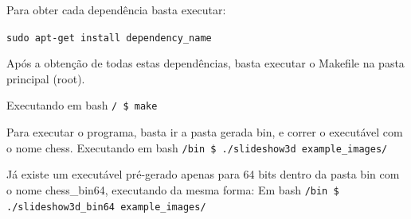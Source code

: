 \documentclass[portugues,final]{revdetua}
\begin{document}
Para obter cada dependência basta executar:

{\tt sudo apt-get install dependency\_name}

Após a obtenção de todas estas dependências, basta executar o Makefile na pasta principal (root).

Executando em bash {\tt / \$ make}

Para executar o programa, basta ir a pasta gerada bin, e correr o executável com o nome chess.
Executando em bash {\tt /bin \$ ./slideshow3d example\_images/}

Já existe um executável pré-gerado apenas para 64 bits dentro da pasta bin com o nome chess\_bin64, executando da mesma forma:
Em bash {\tt /bin \$ ./slideshow3d\_bin64 example\_images/}


\end{document}
